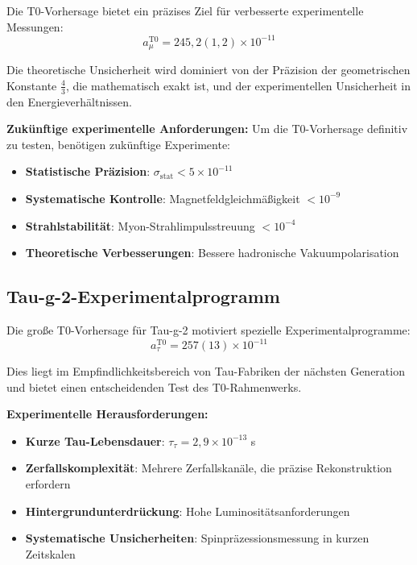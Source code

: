 \documentclass[12pt,a4paper]{report}
\begin{document}
	Die T0-Vorhersage bietet ein präzises Ziel für verbesserte experimentelle Messungen:
	\begin{equation}
		a_\mu^{\text{T0}} = 245,2(1,2) \times 10^{-11}
	\end{equation}
	
	Die theoretische Unsicherheit wird dominiert von der Präzision der geometrischen Konstante $\frac{4}{3}$, die mathematisch exakt ist, und der experimentellen Unsicherheit in den Energieverhältnissen.
	
	\textbf{Zukünftige experimentelle Anforderungen:}
	Um die T0-Vorhersage definitiv zu testen, benötigen zukünftige Experimente:
	\begin{itemize}
		\item \textbf{Statistische Präzision}: $\sigma_{\text{stat}} < 5 \times 10^{-11}$
		\item \textbf{Systematische Kontrolle}: Magnetfeldgleichmäßigkeit $< 10^{-9}$
		\item \textbf{Strahlstabilität}: Myon-Strahlimpulsstreuung $< 10^{-4}$
		\item \textbf{Theoretische Verbesserungen}: Bessere hadronische Vakuumpolarisation
	\end{itemize}
	
	\subsection{Tau-g-2-Experimentalprogramm}
	\label{subsec:tau_g2_program}
	
	Die große T0-Vorhersage für Tau-g-2 motiviert spezielle Experimentalprogramme:
	\begin{equation}
		a_\tau^{\text{T0}} = 257(13) \times 10^{-11}
	\end{equation}
	
	Dies liegt im Empfindlichkeitsbereich von Tau-Fabriken der nächsten Generation und bietet einen entscheidenden Test des T0-Rahmenwerks.
	
	\textbf{Experimentelle Herausforderungen:}
	\begin{itemize}
		\item \textbf{Kurze Tau-Lebensdauer}: $\tau_\tau = 2,9 \times 10^{-13}$ s
		\item \textbf{Zerfallskomplexität}: Mehrere Zerfallskanäle, die präzise Rekonstruktion erfordern
		\item \textbf{Hintergrundunterdrückung}: Hohe Luminositätsanforderungen
		\item \textbf{Systematische Unsicherheiten}: Spinpräzessionsmessung in kurzen Zeitskalen
	\end{itemize}
	
\end{document}
